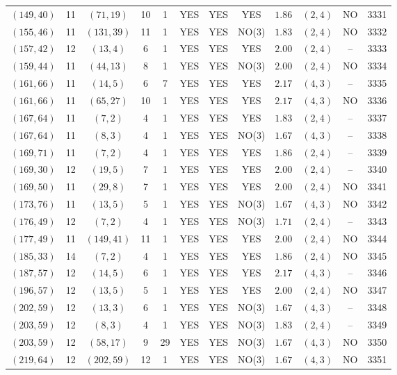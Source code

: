 \begin{longtable}{|c|c|c|c|c|c|c|c|c|c|c|c|}
$(149,40)$ & 11 & $(71,19)$ & 10 & 1 & YES & YES & YES & $1.86$ & $(2,4)$ & NO & 3331\\
$(155,46)$ & 11 & $(131,39)$ & 11 & 1 & YES & YES & NO(3) & $1.83$ & $(2,4)$ & NO & 3332\\
$(157,42)$ & 12 & $(13,4)$ & 6 & 1 & YES & YES & YES & $2.00$ & $(2,4)$ & -- & 3333\\
$(159,44)$ & 11 & $(44,13)$ & 8 & 1 & YES & YES & NO(3) & $2.00$ & $(2,4)$ & NO & 3334\\
$(161,66)$ & 11 & $(14,5)$ & 6 & 7 & YES & YES & YES & $2.17$ & $(4,3)$ & -- & 3335\\
$(161,66)$ & 11 & $(65,27)$ & 10 & 1 & YES & YES & YES & $2.17$ & $(4,3)$ & NO & 3336\\
$(167,64)$ & 11 & $(7,2)$ & 4 & 1 & YES & YES & YES & $1.83$ & $(2,4)$ & -- & 3337\\
$(167,64)$ & 11 & $(8,3)$ & 4 & 1 & YES & YES & NO(3) & $1.67$ & $(4,3)$ & -- & 3338\\
$(169,71)$ & 11 & $(7,2)$ & 4 & 1 & YES & YES & YES & $1.86$ & $(2,4)$ & -- & 3339\\
$(169,30)$ & 12 & $(19,5)$ & 7 & 1 & YES & YES & YES & $2.00$ & $(2,4)$ & -- & 3340\\
$(169,50)$ & 11 & $(29,8)$ & 7 & 1 & YES & YES & YES & $2.00$ & $(2,4)$ & NO & 3341\\
$(173,76)$ & 11 & $(13,5)$ & 5 & 1 & YES & YES & NO(3) & $1.67$ & $(4,3)$ & NO & 3342\\
$(176,49)$ & 12 & $(7,2)$ & 4 & 1 & YES & YES & NO(3) & $1.71$ & $(2,4)$ & -- & 3343\\
$(177,49)$ & 11 & $(149,41)$ & 11 & 1 & YES & YES & YES & $2.00$ & $(2,4)$ & NO & 3344\\
$(185,33)$ & 14 & $(7,2)$ & 4 & 1 & YES & YES & YES & $1.86$ & $(2,4)$ & NO & 3345\\
$(187,57)$ & 12 & $(14,5)$ & 6 & 1 & YES & YES & YES & $2.17$ & $(4,3)$ & -- & 3346\\
$(196,57)$ & 12 & $(13,5)$ & 5 & 1 & YES & YES & YES & $2.00$ & $(2,4)$ & NO & 3347\\
$(202,59)$ & 12 & $(13,3)$ & 6 & 1 & YES & YES & NO(3) & $1.67$ & $(4,3)$ & -- & 3348\\
$(203,59)$ & 12 & $(8,3)$ & 4 & 1 & YES & YES & NO(3) & $1.83$ & $(2,4)$ & -- & 3349\\
$(203,59)$ & 12 & $(58,17)$ & 9 & 29 & YES & YES & NO(3) & $1.67$ & $(4,3)$ & NO & 3350\\
$(219,64)$ & 12 & $(202,59)$ & 12 & 1 & YES & YES & NO(3) & $1.67$ & $(4,3)$ & NO & 3351\\

\end{longtable}

